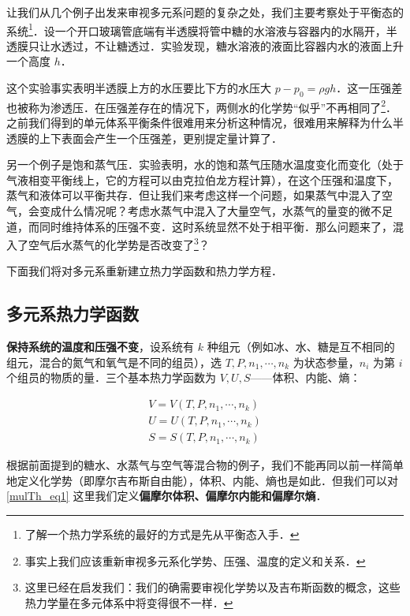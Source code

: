 
让我们从几个例子出发来审视多元系问题的复杂之处，我们主要考察处于平衡态的系统\footnote{了解一个热力学系统的最好的方式是先从平衡态入手．}．设一个开口玻璃管底端有半透膜将管中糖的水溶液与容器内的水隔开，半透膜只让水透过，不让糖透过．实验发现，糖水溶液的液面比容器内水的液面上升一个高度 $h$．

这个实验事实表明半透膜上方的水压要比下方的水压大 $p-p_0=\rho g h$．这一压强差也被称为渗透压．在压强差存在的情况下，两侧水的化学势“似乎”不再相同了\footnote{事实上我们应该重新审视多元系化学势、压强、温度的定义和关系．}．之前我们得到的单元体系平衡条件很难用来分析这种情况，很难用来解释为什么半透膜的上下表面会产生一个压强差，更别提定量计算了．

另一个例子是饱和蒸气压．实验表明，水的饱和蒸气压随水温度变化而变化（处于气液相变平衡线上，它的方程可以由克拉伯龙方程计算），在这个压强和温度下，蒸气和液体可以平衡共存．但让我们来考虑这样一个问题，如果蒸气中混入了空气，会变成什么情况呢？考虑水蒸气中混入了大量空气，水蒸气的量变的微不足道，而同时维持体系的压强不变．这时系统显然不处于相平衡．那么问题来了，混入了空气后水蒸气的化学势是否改变了\footnote{这里已经在启发我们：我们的确需要审视化学势以及吉布斯函数的概念，这些热力学量在多元体系中将变得很不一样．}？

下面我们将对多元系重新建立热力学函数和热力学方程．

\subsection{多元系热力学函数}

\textbf{保持系统的温度和压强不变}，设系统有 $k$ 种组元（例如冰、水、糖是互不相同的组元，混合的氮气和氧气是不同的组员），选 $T,P,n_1,\cdots,n_k$ 为状态参量，$n_i$ 为第 $i$ 个组员的物质的量．三个基本热力学函数为 $V,U,S$——体积、内能、熵：

\begin{equation}\label{mulTh_eq1}
\begin{aligned}
V=V(T,P,n_1,\cdots,n_k)\\
U=U(T,P,n_1,\cdots,n_k)\\
S=S(T,P,n_1,\cdots,n_k)
\end{aligned}
\end{equation}

根据前面提到的糖水、水蒸气与空气等混合物的例子，我们不能再同以前一样简单地定义化学势（即摩尔吉布斯自由能），体积、内能、熵也是如此．但我们可以对\autoref{mulTh_eq1}  这里我们定义\textbf{偏摩尔体积、偏摩尔内能和偏摩尔熵}．

